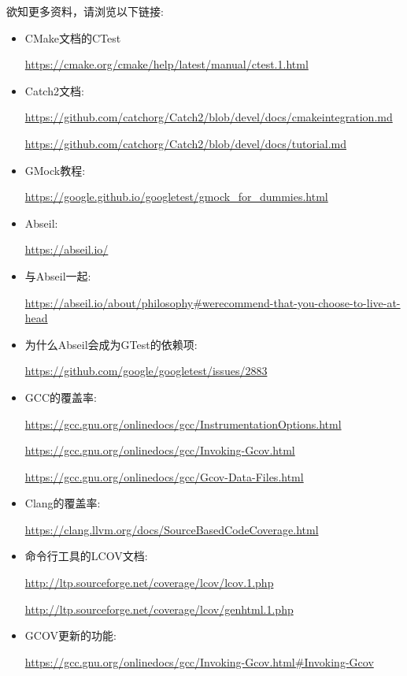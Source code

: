 欲知更多资料，请浏览以下链接:

\begin{itemize}
\item 
CMake文档的CTest

\url{https://cmake.org/cmake/help/latest/manual/ctest.1.html}

\item 
Catch2文档:

\url{https://github.com/catchorg/Catch2/blob/devel/docs/cmakeintegration.md}

\url{https://github.com/catchorg/Catch2/blob/devel/docs/tutorial.md}

\item 
GMock教程: 

\url{https://google.github.io/googletest/gmock\_for\_dummies.html}

\item 
Abseil: 

\url{https://abseil.io/}

\item 
与Abseil一起:

\url{https://abseil.io/about/philosophy\#werecommend-that-you-choose-to-live-at-head}

\item 
为什么Abseil会成为GTest的依赖项:

\url{https://github.com/google/googletest/issues/2883}

\item 
GCC的覆盖率:

\url{https://gcc.gnu.org/onlinedocs/gcc/InstrumentationOptions.html}

\url{https://gcc.gnu.org/onlinedocs/gcc/Invoking-Gcov.html}

\url{https://gcc.gnu.org/onlinedocs/gcc/Gcov-Data-Files.html}

\item 
Clang的覆盖率:

\url{https://clang.llvm.org/docs/SourceBasedCodeCoverage.html}

\item 
命令行工具的LCOV文档:

\url{http://ltp.sourceforge.net/coverage/lcov/lcov.1.php}

\url{http://ltp.sourceforge.net/coverage/lcov/genhtml.1.php}

\item 
GCOV更新的功能:

\url{ https://gcc.gnu.org/onlinedocs/gcc/Invoking-Gcov.html\#Invoking-Gcov}
\end{itemize}